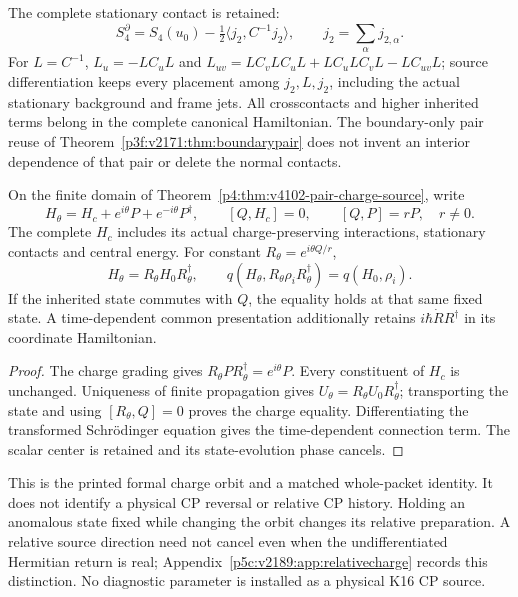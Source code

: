 \documentclass[12pt,a4paper]{article}
\begin{document}
The complete stationary contact is retained:
\[
 S_4^\partial=S_4(u_0)-\tfrac12\langle j_2,C^{-1}j_2\rangle,
 \qquad j_2=\sum_\alpha j_{2,\alpha}.
\]
For $L=C^{-1}$, $L_u=-LC_uL$ and
$L_{uv}=LC_vLC_uL+LC_uLC_vL-LC_{uv}L$; source differentiation
keeps every placement among $j_2,L,j_2$, including the actual stationary
background and frame jets. All crosscontacts and higher inherited terms
belong in the complete canonical Hamiltonian. The boundary-only pair reuse
of Theorem~\ref{p3f:v2171:thm:boundarypair} does not invent an interior
dependence of that pair or delete the normal contacts.

\begin{theorem}
\label{p5c:thm:next187-matched-charge-orbit}
On the finite domain of
Theorem~\ref{p4:thm:v4102-pair-charge-source}, write
\[
 H_\theta=H_c+e^{i\theta}P+e^{-i\theta}P^\dagger,
 \qquad [Q,H_c]=0,\qquad [Q,P]=rP,\quad r\ne0.
\]
The complete $H_c$ includes its actual charge-preserving interactions,
stationary contacts and central energy. For constant
$R_\theta=e^{i\theta Q/r}$,
\begin{equation}
 \boxed{H_\theta=R_\theta H_0R_\theta^\dagger,
 \qquad q(H_\theta,R_\theta\rho_iR_\theta^\dagger)
 =q(H_0,\rho_i).}
 \label{p5c:eq:next187-matched-orbit-charge}
\end{equation}
If the inherited state commutes with $Q$, the equality holds at that same
fixed state. A time-dependent common presentation additionally retains
$i\hbar\dot R R^\dagger$ in its coordinate Hamiltonian.
\end{theorem}
\begin{proof}
The charge grading gives $R_\theta PR_\theta^\dagger=e^{i\theta}P$.
Every constituent of $H_c$ is unchanged. Uniqueness of finite propagation
gives $U_\theta=R_\theta U_0R_\theta^\dagger$; transporting the state and
using $[R_\theta,Q]=0$ proves the charge equality. Differentiating
the transformed Schr\"odinger equation gives the time-dependent connection
term. The scalar center is retained and its state-evolution phase cancels.
\end{proof}
This is the printed formal charge orbit and a matched whole-packet
identity. It does not identify a physical CP reversal or relative CP
history. Holding an anomalous state fixed while changing the orbit changes
its relative preparation. A relative source direction need not cancel even
when the undifferentiated Hermitian return is real;
Appendix~\ref{p5c:v2189:app:relativecharge} records this distinction.
No diagnostic parameter is installed as a physical K16 CP source.
\end{document}
